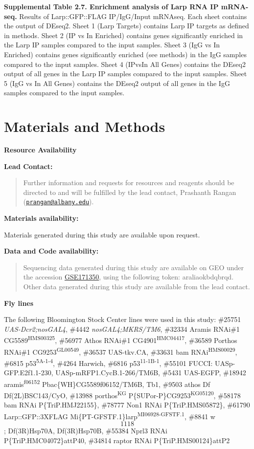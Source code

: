 \documentclass[12pt,oneside]{reedthesis}
\begin{document}
\textbf{\hfill\break
}

\textbf{Supplemental Table 2.7. Enrichment analysis of Larp RNA IP mRNA-seq.}
Results of Larp::GFP::FLAG IP/IgG/Input mRNAseq. Each sheet
contains the output of DEseq2. Sheet 1 (Larp Targets) contains Larp IP
targets as defined in methods. Sheet 2 (IP vs In Enriched) contains
genes significantly enriched in the Larp IP samples compared to the
input samples. Sheet 3 (IgG vs In Enriched) contains genes significantly
enriched (see methods) in the IgG samples compared to the input samples.
Sheet 4 (IPvsIn All Genes) contains the DEseq2 output of all genes in
the Larp IP samples compared to the input samples. Sheet 5 (IgG vs In
All Genes) contains the DEseq2 output of all genes in the IgG samples
compared to the input samples.

\hypertarget{materials-and-methods}{%
\section{Materials and Methods}\label{materials-and-methods}}

\textbf{Resource Availability}

\textbf{Lead Contact:}
\begin{quote}
Further information and requests for resources and reagents should be
directed to and will be fulfilled by the lead contact, Prashanth
Rangan (\href{mailto:prangan@albany.edu}{\nolinkurl{prangan@albany.edu}}).
\end{quote}
\textbf{Materials availability:}

Materials generated during this study are available upon request.

\textbf{Data and Code availability:}
\begin{quote}
Sequencing data generated during this study are available on GEO under
the accession
\href{https://www.ncbi.nlm.nih.gov/geo/query/acc.cgi?acc=GSE171350}{GSE171350},
using the following token: araliaokbdqbrqd. Other data generated
during this study are available from the lead contact.
\end{quote}
\textbf{Fly lines}

The following Bloomington Stock Center lines were used in this study:
\#25751 \emph{UAS-Dcr2;nosGAL4}, \#4442 \emph{nosGAL4;MKRS/TM6}, \#32334 Aramis
RNAi\#1 CG5589\textsuperscript{HMS00325}, \#56977 Athos RNAi\#1 CG4901\textsuperscript{HMC04417}, \#36589
Porthos RNAi\#1 CG9253\textsuperscript{GL00549}, \#36537 UAS-tkv.CA, \#33631 bam
RNAi\textsuperscript{HMS00029}, \#6815 p53\textsuperscript{5A-1-4}, \#4264 Harwich, \#6816 p53\textsuperscript{11-1B-1},
\#55101 FUCCI: UASp-GFP.E2f1.1-230, UASp-mRFP1.CycB.1-266/TM6B, \#5431
UAS-EGFP, \#18942 aramis\textsuperscript{f06152} Pbac\{WH\}CG5589f06152/TM6B, Tb1, \#9503
athos Df Df(2L)BSC143/CyO, \#13988 porthos\textsuperscript{KG} P\{SUPor-P\}CG9253\textsuperscript{KG05120},
\#58178 bam RNAi P\{TriP.HMJ22155\}, \#78777 Non1 RNAi P\{TriP.HMS05872\},
\#61790 Larp::GFP::3XFLAG Mi\{PT-GFSTF.1\}larp\textsuperscript{MI06928-GFSTF.1}, \#8841
w\[1118\]; Df(3R)Hsp70A, Df(3R)Hsp70B, \#55384 Nprl3 RNAi
P\{TriP.HMC04072\}attP40, \#34814 raptor RNAi P\{TriP.HMS00124\}attP2
\end{document}
